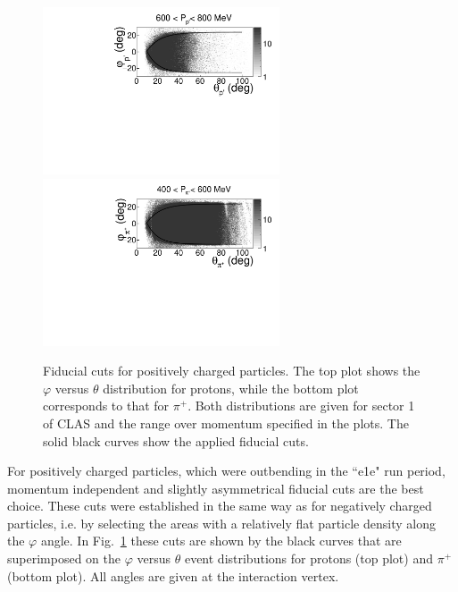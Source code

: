 \documentclass[prc,twocolumn,superscriptaddress,showpacs,amssymb,amsmath,amsfonts,aps,nofootinbib]{revtex4-1}
\begin{document}
\begin{figure}[htp]
\begin{center}
 \includegraphics[width=7cm,keepaspectratio]{pictures/fiducial_cuts/protons.pdf}
\includegraphics[width=7cm,keepaspectratio]{pictures/fiducial_cuts/pip.pdf} 
\vspace{-0.1cm}
\caption{Fiducial cuts for positively charged particles. The top plot shows the $\varphi$ versus $\theta$ distribution for protons, while the bottom plot corresponds to that for $\pi^{+}$. Both distributions are given for sector 1 of CLAS and the range over momentum specified in the plots.  The solid black curves show the applied fiducial cuts. }
\label{fig:fid_cuts_pos}
\end{center}
\end{figure} 



For positively charged particles, which were outbending in the ``e1e" run period, momentum independent and slightly asymmetrical fiducial cuts are the best choice. These cuts were established in the same way as for negatively charged particles, i.e.
by selecting the areas with a relatively flat particle density along the $\varphi$ angle. In Fig.~\ref{fig:fid_cuts_pos} these cuts are shown by the black curves that are superimposed on the $\varphi$ versus $\theta$ event distributions for protons (top plot) and $\pi^{+}$ (bottom plot). All angles are given at the interaction vertex.  
\end{document}
